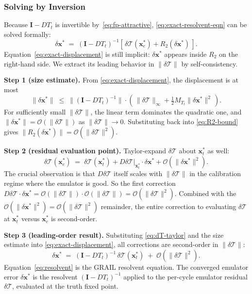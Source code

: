 \documentclass[11pt]{article}
\newcommand{\Tcyc}{\mathcal{T}}
\newcommand{\dT}{\delta\Tcyc}
\begin{document}
\subsubsection{Solving by Inversion}

Because $\mathbf{I} - DT_t$ is invertible by~\eqref{eq:fp-attractive},
\eqref{eq:exact-resolvent-eqn} can be solved formally:
\begin{equation}
\delta\mathbf{x}^{*}
\;=\; (\mathbf{I} - DT_t)^{-1}\!\!\left[\, \dT(\mathbf{x}_e^*) + R_2(\delta\mathbf{x}^{*}) \,\right] .
\label{eq:exact-displacement}
\end{equation}
Equation~\eqref{eq:exact-displacement} is still implicit:
$\delta\mathbf{x}^{*}$ appears inside $R_2$ on the right-hand side.
We extract its leading behavior in $\|\dT\|$ by self-consistency.

\textbf{Step 1 (size estimate).} From \eqref{eq:exact-displacement}, the
displacement is at most
\begin{equation}
\|\delta\mathbf{x}^{*}\|
\;\leq\; \|(\mathbf{I} - DT_t)^{-1}\| \cdot \!\left(\, \|\dT\|_{\infty} + \tfrac{1}{2} M_{T_t} \|\delta\mathbf{x}^{*}\|^2 \,\right) .
\end{equation}
For sufficiently small $\|\dT\|$, the linear term dominates the
quadratic one, and $\|\delta\mathbf{x}^{*}\| = \mathcal{O}(\|\dT\|)$
as $\|\dT\| \to 0$.  Substituting back into \eqref{eq:R2-bound} gives
$\|R_2(\delta\mathbf{x}^{*})\| = \mathcal{O}(\|\dT\|^2)$.

\textbf{Step 2 (residual evaluation point).} Taylor-expand $\dT$ about
$\mathbf{x}_t^*$ as well:
\begin{equation}
\dT(\mathbf{x}_e^*)
\;=\; \dT(\mathbf{x}_t^*) + D\dT\big|_{\mathbf{x}_t^*}\!\cdot\delta\mathbf{x}^{*} + \mathcal{O}(\|\delta\mathbf{x}^{*}\|^2) .
\label{eq:dT-taylor}
\end{equation}
The crucial observation is that $D\dT$ itself scales with $\|\dT\|$ in
the calibration regime where the emulator is good.  So the first
correction $D\dT \cdot \delta\mathbf{x}^{*} = \mathcal{O}(\|\dT\|)
\cdot \mathcal{O}(\|\dT\|) = \mathcal{O}(\|\dT\|^2)$.  Combined with
the $\mathcal{O}(\|\delta\mathbf{x}^{*}\|^2) = \mathcal{O}(\|\dT\|^2)$
remainder, the entire correction to evaluating $\dT$ at
$\mathbf{x}_t^*$ versus $\mathbf{x}_e^*$ is second-order.

\textbf{Step 3 (leading-order result).} Substituting \eqref{eq:dT-taylor}
and the size estimate into \eqref{eq:exact-displacement}, all corrections
are second-order in $\|\dT\|$:
\begin{equation}
\boxed{\;\delta\mathbf{x}^{*}
\;=\; (\mathbf{I} - DT_t)^{-1}\, \dT(\mathbf{x}_t^*)
\;+\; \mathcal{O}\!\left(\|\dT\|^2\right) .\;}
\label{eq:resolvent}
\end{equation}
Equation~\eqref{eq:resolvent} is the GRAIL resolvent equation.  The
converged emulator error $\delta\mathbf{x}^{*}$ is the resolvent
$(\mathbf{I} - DT_t)^{-1}$ applied to the per-cycle emulator residual
$\dT$, evaluated at the truth fixed point.
\end{document}
